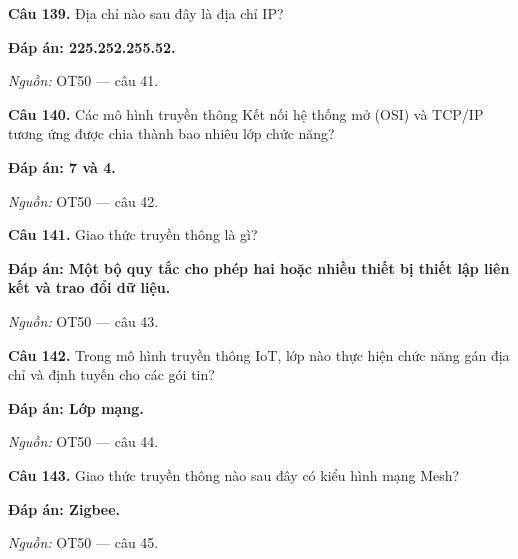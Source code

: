 \documentclass[11pt,a4paper]{article}
\begin{document}
\textbf{Câu 139.} Địa chỉ nào sau đây là địa chỉ IP?\par
{\color{answer}\textbf{Đáp án: 225.252.255.52.}}\par
{\footnotesize\color{sourcegray}\textit{Nguồn:} OT50 — câu 41.\par}
\vspace{3pt}\par\noindent{\color{black!18}\rule{\linewidth}{0.3pt}}\par\medskip

\textbf{Câu 140.} Các mô hình truyền thông Kết nối hệ thống mở (OSI) và TCP/IP tương ứng được chia thành bao nhiêu lớp chức năng?\par
{\color{answer}\textbf{Đáp án: 7 và 4.}}\par
{\footnotesize\color{sourcegray}\textit{Nguồn:} OT50 — câu 42.\par}
\vspace{3pt}\par\noindent{\color{black!18}\rule{\linewidth}{0.3pt}}\par\medskip

\textbf{Câu 141.} Giao thức truyền thông là gì?\par
{\color{answer}\textbf{Đáp án: Một bộ quy tắc cho phép hai hoặc nhiều thiết bị thiết lập liên kết và trao đổi dữ liệu.}}\par
{\footnotesize\color{sourcegray}\textit{Nguồn:} OT50 — câu 43.\par}
\vspace{3pt}\par\noindent{\color{black!18}\rule{\linewidth}{0.3pt}}\par\medskip

\textbf{Câu 142.} Trong mô hình truyền thông IoT, lớp nào thực hiện chức năng gán địa chỉ và định tuyến cho các gói tin?\par
{\color{answer}\textbf{Đáp án: Lớp mạng.}}\par
{\footnotesize\color{sourcegray}\textit{Nguồn:} OT50 — câu 44.\par}
\vspace{3pt}\par\noindent{\color{black!18}\rule{\linewidth}{0.3pt}}\par\medskip

\textbf{Câu 143.} Giao thức truyền thông nào sau đây có kiểu hình mạng Mesh?\par
{\color{answer}\textbf{Đáp án: Zigbee.}}\par
{\footnotesize\color{sourcegray}\textit{Nguồn:} OT50 — câu 45.\par}
\vspace{3pt}\par\noindent{\color{black!18}\rule{\linewidth}{0.3pt}}\par\medskip
\end{document}
